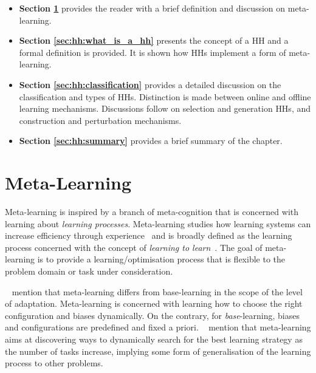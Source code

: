 \begin{itemize}
      \item \textbf{Section \ref{sec:hh:meta_learning}} provides the reader with a brief definition and discussion on meta-learning.

      \item \textbf{Section \ref{sec:hh:what_is_a_hh}} presents the concept of a \acs{HH} and a formal definition is provided. It is shown how \acp{HH} implement a form of meta-learning.

      \item \textbf{Section \ref{sec:hh:classification}} provides a detailed discussion on the classification and types of \acp{HH}. Distinction is made between online and offline learning mechanisms. Discussions follow on selection and generation \acp{HH}, and construction and perturbation mechanisms.

      \item \textbf{Section \ref{sec:hh:summary}} provides a brief summary of the chapter.
\end{itemize}


\section{Meta-Learning}\label{sec:hh:meta_learning}

Meta-learning is inspired by a branch of meta-cognition that is concerned with learning about \textit{learning processes}. Meta-learning studies how learning systems can increase efficiency through experience~\cite{ref:vilalta:2002} and is broadly defined as the learning process concerned with the concept of \textit{learning to learn}~\cite{ref:thrun:1998}. The goal of meta-learning is to provide a learning/optimisation process that is flexible to the problem domain or task under consideration.

\citeauthor{ref:vilalta:2002}~\cite{ref:vilalta:2002} mention that meta-learning differs from base-learning in the scope of the level of adaptation. Meta-learning is concerned with learning how to choose the right configuration and biases dynamically. On the contrary, for \textit{base}-learning, biases and configurations are predefined and fixed a priori. \citeauthor{ref:thrun:1998}~\cite{ref:thrun:1998} mention that meta-learning aims at discovering ways to dynamically search for the best learning strategy as the number of tasks increase, implying some form of generalisation of the learning process to other problems.

